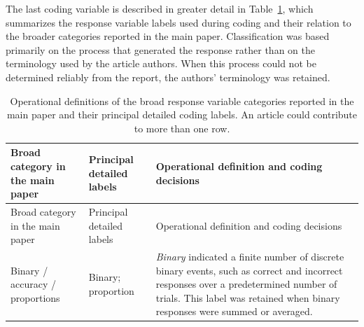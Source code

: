 \documentclass[
  man,
  floatsintext,
  longtable,
  nolmodern,
  notxfonts,
  notimes,
  colorlinks=true,linkcolor=blue,citecolor=blue,urlcolor=blue]{apa7}
\begin{document}
The last coding variable is described in greater detail in
Table~\ref{tbl-response-variable-definitions}, which summarizes the
response variable labels used during coding and their relation to the
broader categories reported in the main paper. Classification was based
primarily on the process that generated the response rather than on the
terminology used by the article authors. When this process could not be
determined reliably from the report, the authors' terminology was
retained.

\begin{longtable}[]{@{}
  >{\raggedright\arraybackslash}p{}
  >{\raggedright\arraybackslash}p{}
  >{\raggedright\arraybackslash}p{}@{}}
\caption{Operational definitions of the broad response variable
categories reported in the main paper and their principal detailed
coding labels. An article could contribute to more than one
row.}\label{tbl-response-variable-definitions}\tabularnewline
\toprule\noalign{}
\begin{minipage}[b]{\linewidth}\raggedright
Broad category in the main paper
\end{minipage} & \begin{minipage}[b]{\linewidth}\raggedright
Principal detailed labels
\end{minipage} & \begin{minipage}[b]{\linewidth}\raggedright
Operational definition and coding decisions
\end{minipage} \\
\midrule\noalign{}
\endfirsthead
\toprule\noalign{}
\begin{minipage}[b]{\linewidth}\raggedright
Broad category in the main paper
\end{minipage} & \begin{minipage}[b]{\linewidth}\raggedright
Principal detailed labels
\end{minipage} & \begin{minipage}[b]{\linewidth}\raggedright
Operational definition and coding decisions
\end{minipage} \\
\midrule\noalign{}
\endhead
\bottomrule\noalign{}
\endlastfoot
Binary / accuracy / proportions & Binary; proportion & \emph{Binary}
indicated a finite number of discrete binary events, such as correct and
incorrect responses over a predetermined number of trials. This label
was retained when binary responses were summed or averaged.

\end{longtable}
\end{document}
